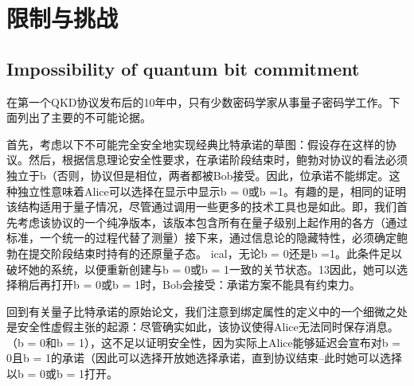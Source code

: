 \chapter{限制与挑战}
\label{chap:限制与挑战}

\section{Impossibility of quantum bit commitment}
在第一个QKD协议\cite{Bennett2014}发布后的10年中，只有少数密码学家从事量子密码学工作。下面列出了主要的不可能论据。

首先，考虑以下不可能完全安全地实现经典比特承诺的草图：假设存在这样的协议。然后，根据信息理论安全性要求，在承诺阶段结束时，鲍勃对协议的看法必须独立于b（否则，协议但是相位，两者都被Bob接受。因此，位承诺不能绑定。这种独立性意味着Alice可以选择在显示中显示b = 0或b =1。有趣的是，相同的证明该结构适用于量子情况，尽管通过调用一些更多的技术工具也是如此。即，我们首先考虑该协议的一个纯净版本，该版本包含所有在量子级别上起作用的各方（通过标准，一个统一的过程代替了测量）接下来，通过信息论的隐藏特性，必须确定鲍勃在提交阶段结束时持有的还原量子态。 ical，无论b = 0还是b =1。此条件足以破坏她的系统，以便重新创建与b = 0或b = 1一致的关节状态。13因此，她可以选择稍后再打开b = 0或b = 1时，Bob会接受：承诺方案不能具有约束力。

回到有关量子比特承诺的原始论文，我们注意到绑定属性的定义中的一个细微之处是安全性虚假主张的起源：尽管确实如此，该协议使得Alice无法同时保存消息。 （b = 0和b = 1），这不足以证明安全性，因为实际上Alice能够延迟会宣布对b = 0且b = 1的承诺（因此可以选择开放她选择承诺，直到协议结束–此时她可以选择以b = 0或b = 1打开。


